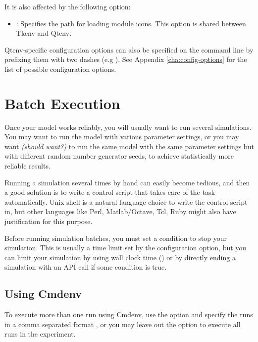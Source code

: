 It is also affected by the following option:

\begin{itemize}
  \item {}: Specifies the path for loading module icons.
  This option is shared between Tkenv and Qtenv.
\end{itemize}

Qtenv-specific configuration options can also be specified on the command line
by prefixing them with two dashes (e.g ). See
Appendix \ref{cha:config-options} for the list of possible configuration options.


\section{Batch Execution}
\label{sec:run-sim:batch-execution}

Once your model works reliably, you will usually want to run several
simulations. You may want to run the model with various
parameter settings, or you may want \textit{(should want?)} to
run the same model with the same parameter settings but with
different random number generator seeds, to achieve statistically
more reliable results.

Running a simulation several times by hand can easily become tedious,
and then a good solution is to write a control script that
takes care of the task automatically. Unix shell is
a natural language choice to write the control script in,
but other languages like Perl, Matlab/Octave, Tcl, Ruby might also have
justification for this purpose.

Before running simulation batches, you must set a condition to
stop your simulation. This is usually a time limit set by the
 configuration option, but you can limit your simulation
by using wall clock time () or by directly ending a
simulation with an API call if some condition is true.

\subsection{Using Cmdenv}
\label{sec:run-sim:batches-using-cmdenv}

To execute more than one run using Cmdenv, use the  option
and specify the runs in a comma separated format , or you may leave
out the  option to execute all runs in the experiment.

